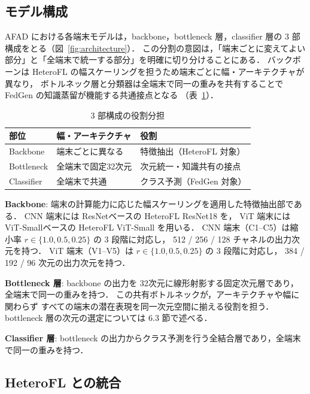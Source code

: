 \documentclass[Japanese,noauthor]{dicomopapers}
\begin{document}
\subsection{モデル構成}

AFAD における各端末モデルは，backbone，bottleneck 層，classifier 層の 3 部構成をとる（図~\ref{fig:architecture}）．
この分割の意図は，「端末ごとに変えてよい部分」と「全端末で統一する部分」を明確に切り分けることにある．
バックボーンは HeteroFL の幅スケーリングを担うため端末ごとに幅・アーキテクチャが異なり，
ボトルネック層と分類器は全端末で同一の重みを共有することで FedGen の知識蒸留が機能する共通接点となる
（表~\ref{tab:role_summary}）．

\begin{table}[htb]
  \centering
  \caption{3 部構成の役割分担}
  \label{tab:role_summary}
  \begin{tabular}{lp{2.4cm}p{3.2cm}}
    \toprule
    部位 & 幅・アーキテクチャ & 役割 \\
    \midrule
    Backbone   & 端末ごとに異なる & 特徴抽出（HeteroFL 対象） \\
    Bottleneck & 全端末で固定32次元 & 次元統一・知識共有の接点 \\
    Classifier & 全端末で共通 & クラス予測（FedGen 対象） \\
    \bottomrule
  \end{tabular}
\end{table}

\textbf{Backbone}:
端末の計算能力に応じた幅スケーリングを適用した特徴抽出部である．
CNN 端末には ResNet\cite{ResNet}ベースの HeteroFL ResNet18 を，
ViT 端末には ViT-Small\cite{VisionTransformer}ベースの HeteroFL ViT-Small を用いる．
CNN 端末（C1–C5）は縮小率 $r \in \{1.0, 0.5, 0.25\}$ の 3 段階に対応し，
512 / 256 / 128 チャネルの出力次元を持つ．
ViT 端末（V1–V5）は $r \in \{1.0, 0.5, 0.25\}$ の 3 段階に対応し，
384 / 192 / 96 次元の出力次元を持つ．

\textbf{Bottleneck 層}:
backbone の出力を 32次元に線形射影する固定次元層であり，全端末で同一の重みを持つ．
この共有ボトルネックが，アーキテクチャや幅に関わらず
すべての端末の潜在表現を同一次元空間に揃える役割を担う．
bottleneck 層の次元の選定については 6.3 節で述べる．

\textbf{Classifier 層}:
bottleneck の出力からクラス予測を行う全結合層であり，全端末で同一の重みを持つ．

\subsection{HeteroFL との統合}
\end{document}
